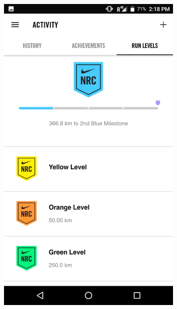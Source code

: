 \documentclass[]{article}
\begin{document}
\begin{figure}
	\includegraphics[width=0.8\textwidth]{running/blue}
\end{figure}
\end{document}
